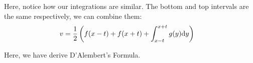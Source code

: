 Here, notice how our integrations are similar. The bottom and top intervals are the same respectively, we can combine them:
%
\begin{align}
  v & =
  \frac{1}{2} \left( f(x - t) + f(x + t) + \int^{x + t}_{x - t} g(y) \text dy \right)
\end{align}


Here, we have derive D'Alembert's Formula.
